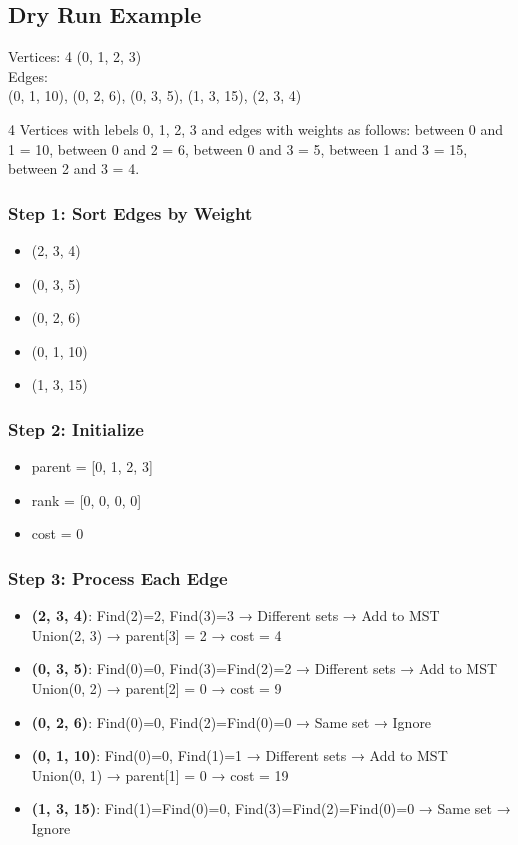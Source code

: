 \documentclass[a4paper,14pt]{extarticle}
\begin{document}
\subsection*{Dry Run Example}

\begin{tcolorbox}[title=Graph Details]
Vertices: 4 (0, 1, 2, 3)\\
Edges:\\
(0, 1, 10), (0, 2, 6), (0, 3, 5), (1, 3, 15), (2, 3, 4)
\end{tcolorbox}
4 Vertices with lebels 0, 1, 2, 3 and edges with weights as follows:
between 0 and 1 = 10, between 0 and 2 = 6, between 0 and 3 = 5, between 1 and 3 = 15, between 2 and 3 = 4.
\subsubsection*{Step 1: Sort Edges by Weight}
\begin{itemize}
    \item (2, 3, 4)
    \item (0, 3, 5)
    \item (0, 2, 6)
    \item (0, 1, 10)
    \item (1, 3, 15)
\end{itemize}

\subsubsection*{Step 2: Initialize}
\begin{itemize}
    \item parent = [0, 1, 2, 3]
    \item rank = [0, 0, 0, 0]
    \item cost = 0
\end{itemize}

\subsubsection*{Step 3: Process Each Edge}
\begin{itemize}
    \item \textbf{(2, 3, 4)}: Find(2)=2, Find(3)=3 → Different sets → Add to MST\\
    \quad Union(2, 3) → parent[3] = 2 → cost = 4

    \item \textbf{(0, 3, 5)}: Find(0)=0, Find(3)=Find(2)=2 → Different sets → Add to MST\\
    \quad Union(0, 2) → parent[2] = 0 → cost = 9

    \item \textbf{(0, 2, 6)}: Find(0)=0, Find(2)=Find(0)=0 → Same set → Ignore

    \item \textbf{(0, 1, 10)}: Find(0)=0, Find(1)=1 → Different sets → Add to MST\\
    \quad Union(0, 1) → parent[1] = 0 → cost = 19

    \item \textbf{(1, 3, 15)}: Find(1)=Find(0)=0, Find(3)=Find(2)=Find(0)=0 → Same set → Ignore
\end{itemize}
\end{document}
